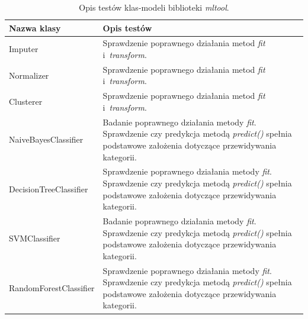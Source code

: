 \documentclass[../thesis.tex]{subfiles}
\begin{document}
\begin{table}[h]
\begin{center}
\begin{tabular}{ | l | p{110mm} | }
\hline
\rowcolor{lightgray} Nazwa klasy & Opis testów \\\hline

Imputer & Sprawdzenie poprawnego działania metod \emph{fit} i~\emph{transform}.\\\hline
Normalizer & Sprawdzenie poprawnego działania metod \emph{fit} i~\emph{transform}.\\\hline
Clusterer & Sprawdzenie poprawnego działania metod \emph{fit} i~\emph{transform}.\\\hline
NaiveBayesClassifier & Badanie poprawnego działania metody \emph{fit}. Sprawdzenie czy predykcja metodą \emph{predict()} spełnia podstawowe założenia dotyczące przewidywania kategorii.\\\hline
DecisionTreeClassifier & Sprawdzenie poprawnego działania metody \emph{fit}. Sprawdzenie czy predykcja metodą \emph{predict()} spełnia podstawowe założenia dotyczące przewidywania kategorii.\\\hline
SVMClassifier & Badanie poprawnego działania metody \emph{fit}. Sprawdzenie czy predykcja metodą \emph{predict()} spełnia podstawowe założenia dotyczące przewidywania kategorii.\\\hline
RandomForestClassifier & Sprawdzenie poprawnego działania metody \emph{fit}. Sprawdzenie czy predykcja metodą \emph{predict()} spełnia podstawowe założenia dotyczące przewidywania kategorii.\\\hline

\end{tabular}
\caption{Opis testów klas-modeli biblioteki \emph{mltool}.}
\label{proj:table_mltool_models}
\end{center}
\end{table}
\end{document}
